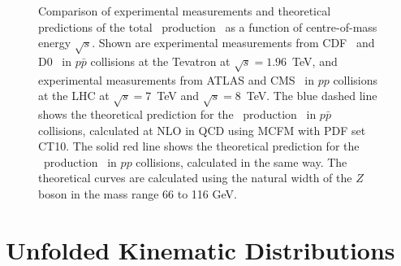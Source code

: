 \begin{figure}[htbp]
\begin{center}
\caption[Comparison of experimental measurements and theoretical predictions of the total
\ZZ\ production \cx\ as a function of centre-of-mass energy $\sqrt{s}$.]{
\small
Comparison of experimental measurements and theoretical predictions of the total
\ZZ\ production \cx\ as a function of centre-of-mass energy $\sqrt{s}$. Shown
are experimental measurements from CDF~\cite{CDF:2011ab} and
D0~\cite{Abazov:2012cj} in $p\bar{p}$ collisions at the Tevatron at $\sqrt{s} =
1.96$~TeV, and experimental measurements from ATLAS and
CMS~\cite{CMS:2012rg,CMS:2013oev} in $pp$ collisions at the LHC at $\sqrt{s} =
7$~TeV and $\sqrt{s} = 8$~TeV. The blue dashed line shows the theoretical
prediction for the \ZZ\ production \cx\ in $p\bar{p}$ collisions,
calculated at NLO in QCD using MCFM with PDF set CT10. The solid red line shows
the theoretical prediction for the \ZZ\ production \cx\ in $pp$
collisions, calculated in the same way.  The theoretical curves are calculated
using the natural width of the $Z$ boson in the mass range 66 to 116 GeV.
 }
\label{fig:sqrts-plot}
\end{center}
\end{figure}



\section{Unfolded Kinematic Distributions}
\label{sec:results-unfolded}

